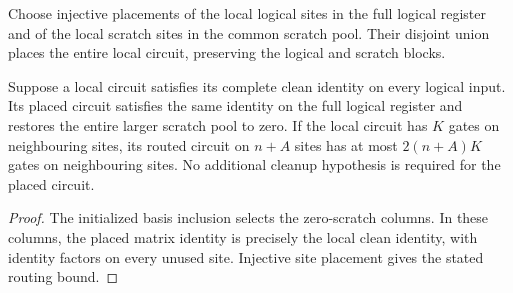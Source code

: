 \begin{definition}
    \label{def:mpu_clean_circuit_placement}
    \leanok
    Choose injective placements of the local logical sites in the
    full logical register and of the local scratch sites in the
    common scratch pool. Their disjoint union places the entire
    local circuit, preserving the logical and scratch blocks.
\end{definition}

\begin{lemma}
    \label{thm:mpu_clean_circuit_placement}
    \leanok
    Suppose a local circuit satisfies its complete clean identity
    on every logical input. Its placed circuit satisfies the same
    identity on the full logical register and restores the entire
    larger scratch pool to zero. If the local circuit has $K$ gates on
    neighbouring sites, its routed circuit on $n+A$ sites has at most $2(n+A)K$ gates on
    neighbouring sites.
    No additional cleanup hypothesis is required for the placed circuit.
\end{lemma}
\begin{proof}\leanok
    The initialized basis inclusion selects the zero-scratch columns.
    In these columns, the placed matrix identity is precisely the
    local clean identity, with identity factors on every unused site.
    Injective site placement gives the stated routing bound.
\end{proof}

